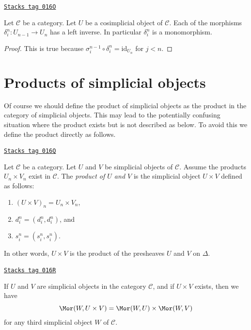 \begin{lemma}[Di injective]
\label{simplicial-lemma-di-injective}
\href{https://stacks.math.columbia.edu/tag/016O}{\texttt{Stacks tag 016O}}

Let $\mathcal{C}$ be a category.
Let $U$ be a cosimplicial object of $\mathcal{C}$.
Each of the morphisms $\delta^n_i : U_{n - 1} \to U_n$
has a left inverse. In particular $\delta^n_i$ is a monomorphism.
\end{lemma}

\begin{proof}
This is true because
$\sigma_i^{n - 1} \circ \delta^n_i = \text{id}_{U_n}$
for $j < n$.
\end{proof}

\section{Products of simplicial objects}
\label{simplicial-section-products}
Of course we should define the product of simplicial objects
as the product in the category of simplicial objects. This
may lead to the potentially confusing situation where the product exists
but is not described as below. To avoid this we define the product
directly as follows.

\begin{definition}[Product]
\label{simplicial-definition-product}
\href{https://stacks.math.columbia.edu/tag/016Q}{\texttt{Stacks tag 016Q}}

Let $\mathcal{C}$ be a category.
Let $U$ and $V$ be simplicial objects of $\mathcal{C}$.
Assume the products $U_n \times V_n$ exist in $\mathcal{C}$.
The {\it product of $U$ and $V$} is the simplicial object
$U \times V$ defined as follows:
\begin{enumerate}
\item $(U \times V)_n = U_n \times V_n$,
\item $d^n_i = (d^n_i, d^n_i)$, and
\item $s^n_i = (s^n_i, s^n_i)$.
\end{enumerate}
In other words, $U \times V$ is the product of the presheaves
$U$ and $V$ on $\Delta$.
\end{definition}

\begin{lemma}[Product]
\label{simplicial-lemma-product}
\href{https://stacks.math.columbia.edu/tag/016R}{\texttt{Stacks tag 016R}}

If $U$ and $V$ are simplicial objects in the category $\mathcal{C}$,
and if $U \times V$ exists, then we have
$$
\Mor(W, U \times V) =
\Mor(W, U) \times
\Mor(W, V)
$$
for any third simplicial object $W$ of $\mathcal{C}$.
\end{lemma}

